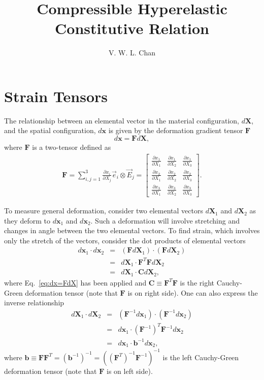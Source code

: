 \documentclass[12pt,aps,pre]{revtex4}
\begin{document}
\title{Compressible Hyperelastic Constitutive Relation}
\author{V. W. L. Chan}
\maketitle

\section{Strain Tensors}

The relationship between an elemental vector in the material configuration, $d\pmb{X}$, and the spatial configuration, $d\pmb{x}$ is given by the deformation gradient tensor $\pmb{F}$
%
\begin{equation}
d\pmb{x} = \pmb{F}d\pmb{X},
\label{eq:dx=FdX}
\end{equation}
%
where $\pmb{F}$ is a two-tensor defined as
%
\begin{eqnarray}
\pmb{F} = \sum_{i,j=1}^3 \frac{\partial x_i}{\partial X_j} \vec{e}_i \otimes \vec{E}_j =
%
\begin{bmatrix}
\frac{\partial x_1}{\partial X_1} & \frac{\partial x_1}{\partial X_2} & \frac{\partial x_1}{\partial X_3} \\
\frac{\partial x_2}{\partial X_1} & \frac{\partial x_2}{\partial X_2} & \frac{\partial x_2}{\partial X_3} \\
\frac{\partial x_3}{\partial X_1} & \frac{\partial x_3}{\partial X_2} & \frac{\partial x_3}{\partial X_3} 
\end{bmatrix}.
\label{eq:deformation-gradient}
\end{eqnarray}
%

To measure general deformation, consider two elemental vectors $d\pmb{X}_1$ and $d\pmb{X}_2$ as they deform to $d\pmb{x}_1$ and $d\pmb{x}_2$. Such a deformation will involve stretching and changes in angle between the two elemental vectors. To find strain, which involves only the stretch of the vectors, consider the dot products of elemental vectors
%
\begin{eqnarray}
d\pmb{x}_1 \cdot d\pmb{x}_2 &=& (\pmb{F} d\pmb{X}_1) \cdot (\pmb{F}d\pmb{X}_2) \nonumber\\
%
&=& d\pmb{X}_1 \cdot \pmb{F}^T\pmb{F} d\pmb{X}_2 \nonumber\\
&=& d\pmb{X}_1 \cdot \pmb{C} d\pmb{X}_2,
\end{eqnarray}
%
where Eq.\ \eqref{eq:dx=FdX} has been applied and $\pmb{C} \equiv \pmb{F}^T \pmb{F}$ is the right Cauchy-Green deformation tensor (note that $\pmb{F}$ is on right side). One can also express the inverse relationship
%
\begin{eqnarray}
d\pmb{X}_1 \cdot d\pmb{X}_2 &=& (\pmb{F}^{-1}d\pmb{x}_1) \cdot (\pmb{F}^{-1} d\pmb{x}_2) \nonumber\\
&=& d\pmb{x}_1 \cdot (\pmb{F}^{-1})^T\pmb{F}^{-1} d\pmb{x}_2 \nonumber\\
&=& d\pmb{x}_1 \cdot \pmb{b}^{-1} d\pmb{x}_2,
\end{eqnarray}
%
where $\pmb{b} \equiv \pmb{F}\pmb{F}^T = (\pmb{b}^{-1})^{-1} = ((\pmb{F}^T)^{-1} \pmb{F}^{-1})^{-1}$ is the left Cauchy-Green deformation tensor (note that $\pmb{F}$ is on left side).
\end{document}
